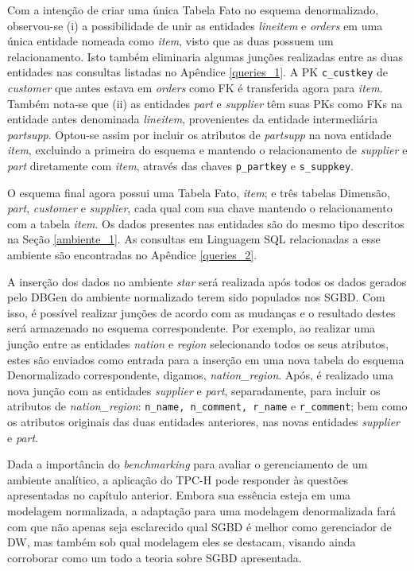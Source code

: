 Com a intenção de criar uma única Tabela Fato no esquema denormalizado, observou-se (i) a possibilidade de unir as entidades \textit{lineitem} e \textit{orders} em uma única entidade nomeada como \textit{item}, visto que as duas possuem um relacionamento. Isto também eliminaria algumas junções realizadas entre as duas entidades nas consultas listadas no Apêndice \ref{queries_1}. A PK \texttt{c\_custkey} de \textit{customer} que antes estava em \textit{orders} como FK é transferida agora para \textit{item}. Também nota-se que (ii) as entidades \textit{part} e \textit{supplier} têm suas PKs como FKs na entidade antes denominada \textit{lineitem}, provenientes da entidade intermediária \textit{partsupp}. Optou-se assim por incluir os atributos de \textit{partsupp} na nova entidade \textit{item}, excluindo a primeira do esquema e mantendo o relacionamento de \textit{supplier} e \textit{part} diretamente com \textit{item}, através das chaves \texttt{p\_partkey} e \texttt{s\_suppkey}.

O esquema final agora possui uma Tabela Fato, \textit{item}; e três tabelas Dimensão, \textit{part}, \textit{customer} e \textit{supplier}, cada qual com sua chave mantendo o relacionamento com a tabela \textit{item}. Os dados presentes nas entidades são do mesmo tipo descritos na Seção \ref{ambiente_1}. As consultas em Linguagem SQL relacionadas a esse ambiente são encontradas no Apêndice \ref{queries_2}.

A inserção dos dados no ambiente \textit{star} será realizada após todos os dados gerados pelo DBGen do ambiente normalizado terem sido populados nos SGBD. Com isso, é possível realizar junções de acordo com as mudanças e o resultado destes será armazenado no esquema correspondente. Por exemplo, ao realizar uma junção entre as entidades \textit{nation} e \textit{region} selecionando todos os seus atributos, estes são enviados como entrada para a inserção em uma nova tabela do esquema Denormalizado correspondente, digamos, \textit{nation\_region}. Após, é realizado uma nova junção com as entidades \textit{supplier} e \textit{part}, separadamente, para incluir os atributos de \textit{nation\_region}: \texttt{n\_name, n\_comment, r\_name} e \texttt{r\_comment}; bem como os atributos originais das duas entidades anteriores, nas novas entidades \textit{supplier} e \textit{part}.

Dada a importância do \textit{benchmarking} para avaliar o gerenciamento de um ambiente analítico, a aplicação do TPC-H pode responder às questões apresentadas no capítulo anterior. Embora sua essência esteja em uma modelagem normalizada, a adaptação para uma modelagem denormalizada fará com que não apenas seja esclarecido qual SGBD é melhor como gerenciador de DW, mas também sob qual modelagem eles se destacam, visando ainda corroborar como um todo a teoria sobre SGBD apresentada.